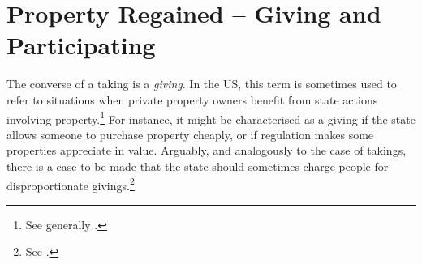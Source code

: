 {%



}

\section{Property Regained -- Giving and Participating}\label{sec:7:2}

The converse of a taking is a {\it giving}. In the US, this term is sometimes used to refer to situations when private property owners benefit from state actions involving property.\footnote{See generally \cite{bell01}.} For instance, it might be characterised as a giving if the state allows someone to purchase property cheaply, or if regulation makes some properties appreciate in value. Arguably, and analogously to the case of takings, there is a case to be made that the state should sometimes charge people for disproportionate givings.\footnote{See \cite[590-604]{bell01}.}

